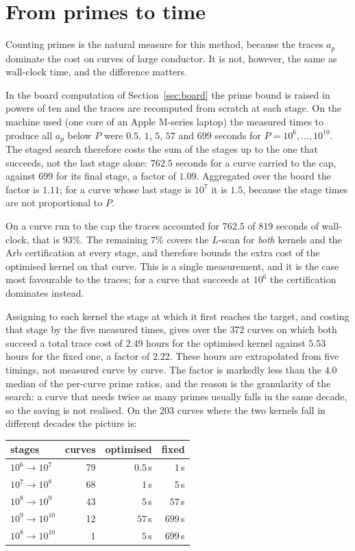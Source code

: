 \documentclass[11pt]{amsart}
\theoremstyle{remark}
\theoremstyle{definition}
\begin{document}
\BoardTrend{} \BoardDetail

\section{From primes to time}
\label{sec:time}

Counting primes is the natural measure for this method, because the traces $a_p$ dominate the
cost on curves of large conductor. It is not, however, the same as wall-clock time, and the
difference matters.

In the board computation of Section~\ref{sec:board} the prime bound is raised in powers of ten and
the traces are recomputed from scratch at each stage. On the machine used (one core of an Apple
M-series laptop) the measured times to produce all $a_p$ below $P$ were $0.5$, $1$, $5$, $57$ and
$699$ seconds for $P=10^6,\dots,10^{10}$. The staged search therefore costs the sum of the stages up
to the one that succeeds, not the last stage alone: $762.5$ seconds for a curve carried to the cap,
against $699$ for its final stage, a factor of $1.09$. Aggregated over the board the factor is
$1.11$; for a curve whose last stage is $10^7$ it is $1.5$, because the stage times are not
proportional to $P$.

On a curve run to the cap the traces accounted for $762.5$ of $819$ seconds of wall-clock, that is
$93\%$. The remaining $7\%$ covers the $L$-scan for \emph{both} kernels and the Arb certification at
every stage, and therefore bounds the extra cost of the optimised kernel on that curve. This is a
single measurement, and it is the case most favourable to the traces; for a curve that succeeds at
$10^6$ the certification dominates instead.

Assigning to each kernel the stage at which it first reaches the target, and costing that stage by
the five measured times, gives over the $372$ curves on which both succeed a total trace cost of
$2.49$ hours for the optimised kernel against $5.53$ hours for the fixed one, a factor of $2.22$.
These hours are extrapolated from five timings, not measured curve by curve. The factor is markedly
less than the $4.0$ median of the per-curve prime ratios, and the reason is the granularity of the
search: a curve that needs twice as many primes usually falls in the same decade, so the saving is
not realised. On the $203$ curves where the two kernels fall in different decades the picture is:

\begin{center}\small
\begin{tabular}{lrrr}
\toprule
stages & curves & optimised & fixed\\
\midrule
$10^6\to10^7$ & 79 & $0.5$\,s & $1$\,s\\
$10^7\to10^8$ & 68 & $1$\,s & $5$\,s\\
$10^8\to10^9$ & 43 & $5$\,s & $57$\,s\\
$10^9\to10^{10}$ & 12 & $57$\,s & $699$\,s\\
$10^8\to10^{10}$ & 1 & $5$\,s & $699$\,s\\
\bottomrule
\end{tabular}
\end{center}
\end{document}
